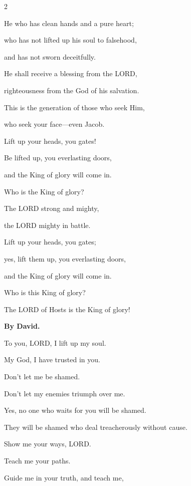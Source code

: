 \begin{multicols}{2}
	
	\myverse{}He who has clean hands and a pure heart;
	
	who has not lifted up his soul to falsehood,
	
	and has not sworn deceitfully.
	
	
	\myverse{}He shall receive a blessing from the LORD,
	
	righteousness from the God of his salvation.
	
	
	\myverse{}This is the generation of those who seek Him,
	
	who seek your face---even Jacob.
	
	
	\vspace{\baselineskip}
	
	\myverse{}Lift up your heads, you gates!
	
	Be lifted up, you everlasting doors,
	
	and the King of glory will come in.
	
	
	\myverse{}Who is the King of glory?
	
	The LORD strong and mighty,
	
	the LORD mighty in battle.
	
	
	\myverse{}Lift up your heads, you gates;
	
	yes, lift them up, you everlasting doors,
	
	and the King of glory will come in.
	
	
	\myverse{}Who is this King of glory?
	
	The LORD of Hosts is the King of glory!

	
	
	\mychapter{}\textbf{By David.}
	
	\quad \myverse*{}To you, LORD, I lift up my soul.
	
	
	\myverse{}My God, I have trusted in you.
	
	Don’t let me be shamed.
	
	Don’t let my enemies triumph over me.
	
	
	\myverse{}Yes, no one who waits for you will be shamed.
	
	They will be shamed who deal treacherously without cause.
	
	\vspace{\baselineskip}
	
	\myverse{}Show me your ways, LORD.
	
	Teach me your paths.
	
	
	\myverse{}Guide me in your truth, and teach me,
	

\end{multicols}
